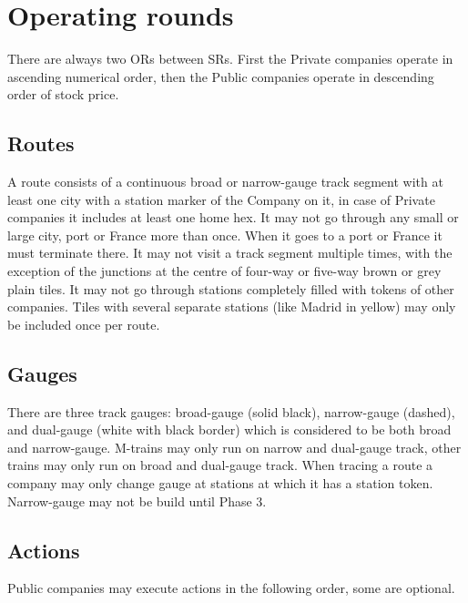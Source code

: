 \documentclass[a4paper,twocolumn]{article}
\begin{document}
\section{Operating rounds}
There are always two ORs between SRs. First the Private companies operate in
ascending numerical order, then the Public companies operate in descending order
of stock price.

\subsection{Routes}
A route consists of a continuous broad or narrow-gauge track segment with at
least one city with a station marker of the Company on it, in case of Private
companies it includes at least one home hex. It may not go through any small or
large city, port or France more than once. When it goes to a port or France it
must terminate there. It may not visit a track segment multiple times, with the
exception of the junctions at the centre of four-way or five-way brown or grey
plain tiles. It may not go through stations completely filled with tokens of
other companies. Tiles with several separate stations (like Madrid in yellow)
may only be included once per route.

\subsection{Gauges}
There are three track gauges: broad-gauge (solid black), narrow-gauge (dashed),
and dual-gauge (white with black border) which is considered to be both broad
and narrow-gauge. M-trains may only run on narrow and dual-gauge track, other
trains may only run on broad and dual-gauge track. When tracing a route a
company may only change gauge at stations at which it has a station token.
Narrow-gauge may not be build until Phase 3.

\subsection{Actions}
Public companies may execute actions in the following order, some are optional.
\end{document}
